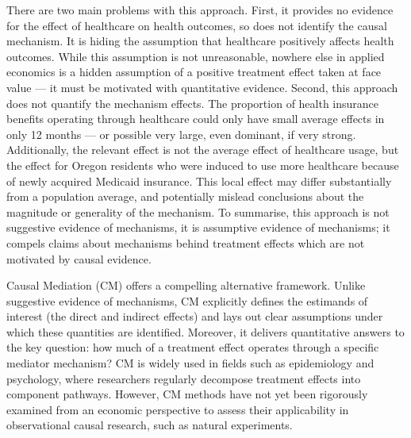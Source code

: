 There are two main problems with this approach.
First, it provides no evidence for the effect of healthcare on health outcomes, so does not identify the causal mechanism.
It is hiding the assumption that healthcare positively affects health outcomes.
While this assumption is not unreasonable, nowhere else in applied economics is a hidden assumption of a positive treatment effect taken at face value --- it must be motivated with quantitative evidence.
Second, this approach does not quantify the mechanism effects.
The proportion of health insurance benefits operating through healthcare could only have small average effects in only 12 months --- or possible very large, even dominant, if very strong.
Additionally, the relevant effect is not the average effect of healthcare usage, but the effect for Oregon residents who were induced to use more healthcare because of newly acquired Medicaid insurance. 
This local effect may differ substantially from a population average, and potentially mislead conclusions about the magnitude or generality of the mechanism.
To summarise, this approach is not suggestive evidence of mechanisms, it is assumptive evidence of mechanisms; it compels claims about mechanisms behind treatment effects which are not motivated by causal evidence.


Causal Mediation (CM) offers a compelling alternative framework.
Unlike suggestive evidence of mechanisms, CM explicitly defines the estimands of interest (the direct and indirect effects) and lays out clear assumptions under which these quantities are identified.
Moreover, it delivers quantitative answers to the key question: how much of a treatment effect operates through a specific mediator mechanism?
CM is widely used in fields such as epidemiology and psychology, where researchers regularly decompose treatment effects into component pathways.
However, CM methods have not yet been rigorously examined from an economic perspective to assess their applicability in observational causal research, such as natural experiments.
